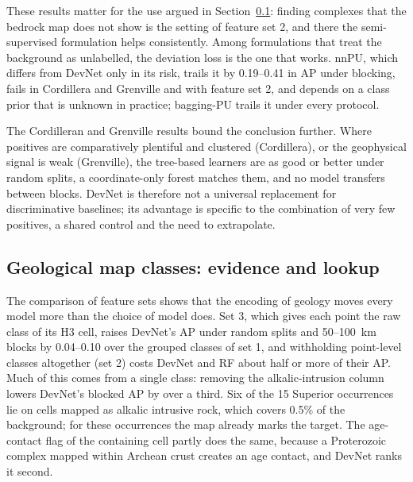 \documentclass[pdflatex,sn-apa]{sn-jnl}
\begin{document}
These results matter for the use argued in Section~\ref{sec:disc-mapclasses}: finding complexes that the bedrock map does not show is the setting of feature set 2, and there the semi-supervised formulation helps consistently. Among formulations that treat the background as unlabelled, the deviation loss is the one that works. nnPU, which differs from DevNet only in its risk, trails it by 0.19--0.41 in AP under blocking, fails in Cordillera and Grenville and with feature set 2, and depends on a class prior that is unknown in practice; bagging-PU trails it under every protocol.

The Cordilleran and Grenville results bound the conclusion further. Where positives are comparatively plentiful and clustered (Cordillera), or the geophysical signal is weak (Grenville), the tree-based learners are as good or better under random splits, a coordinate-only forest matches them, and no model transfers between blocks. DevNet is therefore not a universal replacement for discriminative baselines; its advantage is specific to the combination of very few positives, a shared control and the need to extrapolate.

\subsection{Geological map classes: evidence and lookup}\label{sec:disc-mapclasses}

The comparison of feature sets shows that the encoding of geology moves every model more than the choice of model does. Set 3, which gives each point the raw class of its H3 cell, raises DevNet's AP under random splits and 50--100~km blocks by 0.04--0.10 over the grouped classes of set 1, and withholding point-level classes altogether (set 2) costs DevNet and RF about half or more of their AP. Much of this comes from a single class: removing the alkalic-intrusion column lowers DevNet's blocked AP by over a third. Six of the 15 Superior occurrences lie on cells mapped as alkalic intrusive rock, which covers 0.5\% of the background; for these occurrences the map already marks the target. The age-contact flag of the containing cell partly does the same, because a Proterozoic complex mapped within Archean crust creates an age contact, and DevNet ranks it second.
\end{document}
